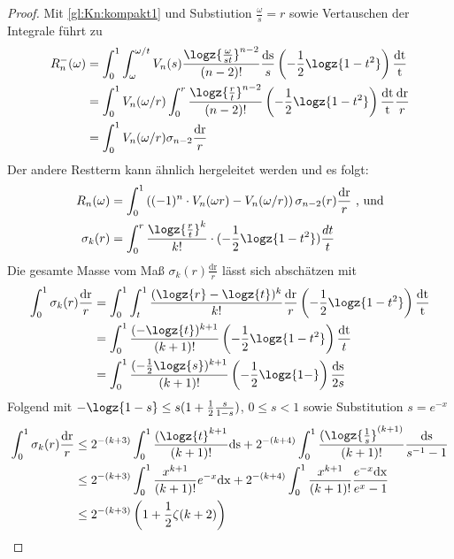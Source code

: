 \begin{satz}
\begin{proof}
		Mit \ref{gl:Kn:kompakt1} und Substiution $\frac{\omega}{s} = r$ sowie Vertauschen der Integrale führt zu
		\begin{align}
			R_n^-(\omega) &=\int_0^1 \int_{\omega}^{\omega/t} V_n(s) \frac{\logz{\frac{\omega}{s t}}^{n-2}}{(n-2)!} \frac{\mathrm{ds}}{s}  \left(-\frac{1}{2} \logz{1-t^2}\right) \frac{\mathrm{dt}}{\mathrm{t}}\\
			&=\int_0^1 V_n(\omega/r) \int_{0}^{r}  \frac{\logz{\frac{r}{t}}^{n-2}}{(n-2)!} \left(-\frac{1}{2} \logz{1-t^2}\right) \frac{\mathrm{dt}}{\mathrm{t}} \frac{\mathrm{dr}}{r}\\
			&=\int_0^1 V_n(\omega/r) \sigma_{n-2} \frac{\mathrm{dr}}{r}
		\end{align}
		Der andere Restterm kann ähnlich hergeleitet werden und es folgt:
		\begin{align}
			R_n(\omega) &= \int_0^1 \left((-1)^n \cdot V_n(\omega r) - V_n(\omega/r) \right) \sigma_{n-2}(r) \frac{\mathrm{dr}}{r}\text{ , und}\\
	\sigma_k(r) &= \int_0^r \frac{\logz{\frac{r}{t}}^k}{k!} \cdot (-\frac{1}{2} \logz{1-t^2})\frac{dt}{t} 
		\end{align}	
	 	Die gesamte Masse vom Maß $\sigma_k(r) \frac{\mathrm{dr}}{r}$ lässt sich abschätzen mit
	 	\begin{align}
	 	\int_0^1 \sigma_k(r) \frac{\mathrm{dr}}{r} &= \int_0^1 \int_{t}^{1}  \frac{(\logz{r} - \logz{t})^{k}}{k!}  \frac{\mathrm{dr}}{r} \left(-\frac{1}{2} \logz{1-t^2}\right) \frac{\mathrm{dt}}{\mathrm{t}} \\
	 	&= \int_0^1 \frac{(-\logz{t})^{k+1}}{(k+1)!} \left(-\frac{1}{2} \logz{1-t^2} \right) \frac{\mathrm{dt}}{t}\\
	 	&= \int_0^1 \frac{(-\frac{1}{2} \logz{s})^{k+1}}{(k+1)!} \left(-\frac{1}{2} \logz{1-} \right) \frac{\mathrm{ds}}{2s}
	 	\end{align}
	 	Folgend mit $-\logz{1-s} \leq s(1+\frac{1}{2} \frac{s}{1-s})$, $0 \leq s < 1$ sowie Substitution $s = e^{-x}$
	 	\begin{align}
	 		\int_0^1 \sigma_k(r) \frac{\mathrm{dr}}{r} &\leq 2^{-(k+3)} \int_0^1 \frac{(\logz{t}^{k+1}}{(k+1)!} \mathrm{ds}
	 		+  2^{-(k+4)} \int_0^1 \frac{(\logz{\frac{1}{s}}^{(k+1)}}{(k+1)!} \frac{\mathrm{ds}}{s^{-1} -1}\\
	 		&\leq 2^{-(k+3)} \int_0^1 \frac{x^{k+1}}{(k+1)!} e^{-x} \mathrm{dx}
	 		+  2^{-(k+4)} \int_0^1 \frac{x^{k+1}}{(k+1)!} \frac{e^{-x} \mathrm{dx}}{e^{x} -1} \\
	 		&\leq 2^{-(k+3)} \left(1 + \frac{1}{2} \zeta(k+2)\right)\label{gl:mass}

\end{align}
\end{proof}
\end{satz}
